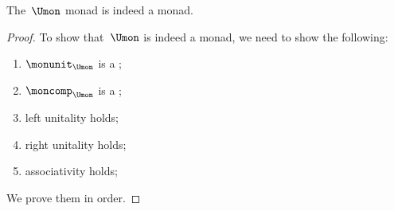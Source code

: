 \begin{lemma}
    The~$\Umon$ monad is indeed a monad.
\end{lemma}
\begin{proof}
    To show that~$\Umon$ is indeed a monad, we need to show the following:
    \begin{enumerate}
        \item $\monunit_{\Umon}$ is a ;
        \item $\moncomp_{\Umon}$ is a ;
        \item left unitality holds;
        \item right unitality holds;
        \item associativity holds;
    \end{enumerate}
    We prove them in order.


\end{proof}

